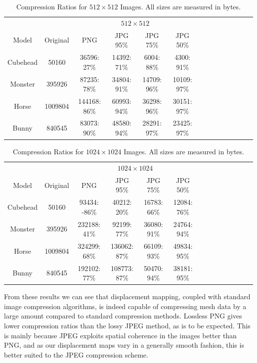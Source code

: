 \begin{table}
\begin{center}
\begin{tabular}{c||c|cccc|cccc|cccc}
 & & \multicolumn{4}{|c|}{$512\times512$} \\
Model & Original & PNG & JPG 95\% & JPG 75\% & JPG 50\% \\
\hline
Cubehead & 50160 & 
36596: 27\% & 14392: 71\% & 6004: 88\% & 4300: 91\% \\
Monster & 395926 & 
87235: 78\% & 34804: 91\% & 14709: 96\% & 10109: 97\% \\
Horse & 1009804 & 
144168: 86\% & 60993: 94\% & 36298: 96\% & 30151: 97\% \\
Bunny & 840545 & 
83073: 90\% & 48580: 94\% & 28291: 97\% & 23425: 97\% 
\end{tabular}
\caption[Compression Ratios for $512\times512$ Images.]{\label{tbl:filesizes512} Compression Ratios for $512\times512$ Images. All sizes are measured in bytes.}
\end{center}
\end{table}

\begin{table}
\begin{center}
\begin{tabular}{c||c|cccc|cccc|cccc}
 & & \multicolumn{4}{|c|}{$1024\times1024$} \\
Model & Original & PNG & JPG 95\% & JPG 75\% & JPG 50\% \\
\hline
Cubehead & 50160 & 
93434: -86\% & 40212: 20\% & 16783: 66\% & 12084: 76\% \\
Monster & 395926 & 
232188: 41\% & 92199: 77\% & 36080: 91\% & 24764: 94\% \\
Horse & 1009804 & 
324299: 68\% & 136062: 87\% & 66109: 93\% & 49834: 95\% \\
Bunny & 840545 & 
192102: 77\% & 108773: 87\% & 50470: 94\% & 38181: 95\% 
\end{tabular}
\caption[Compression Ratios for $1024\times1024$ Images.]{\label{tbl:filesizes1024} Compression Ratios for $1024\times1024$ Images. All sizes are measured in bytes.}
\end{center}
\end{table}

From these results we can see that displacement mapping, coupled with standard image compression algorithms, is indeed capable of compressing mesh data by a large amount compared to standard compression methods. Lossless PNG gives lower compression ratios than the lossy JPEG method, as is to be expected. This is mainly because JPEG exploits spatial coherence in the images better than PNG, and as our displacement maps vary in a generally smooth fashion, this is better suited to the JPEG compression scheme. 


